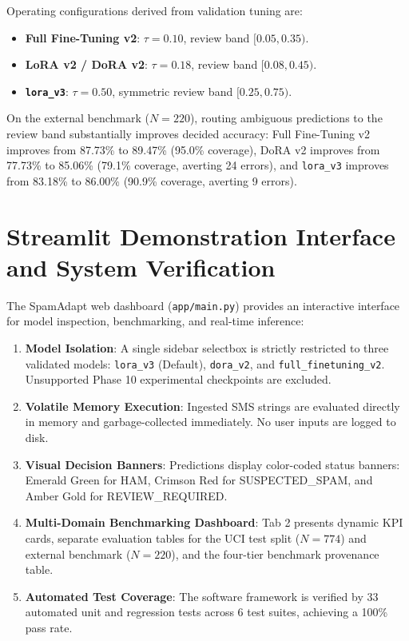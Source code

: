 \documentclass[conference]{IEEEtran}
\begin{document}
Operating configurations derived from validation tuning are:
\begin{itemize}
    \item \textbf{Full Fine-Tuning v2}: $\tau = 0.10$, review band $[0.05, 0.35)$.
    \item \textbf{LoRA v2 / DoRA v2}: $\tau = 0.18$, review band $[0.08, 0.45)$.
    \item \textbf{\texttt{lora\_v3}}: $\tau = 0.50$, symmetric review band $[0.25, 0.75)$.
\end{itemize}

On the external benchmark ($N=220$), routing ambiguous predictions to the review band substantially improves decided accuracy: Full Fine-Tuning v2 improves from 87.73\% to 89.47\% (95.0\% coverage), DoRA v2 improves from 77.73\% to 85.06\% (79.1\% coverage, averting 24 errors), and \texttt{lora\_v3} improves from 83.18\% to 86.00\% (90.9\% coverage, averting 9 errors).

\section{Streamlit Demonstration Interface and System Verification}
\label{sec:demo_interface}

The SpamAdapt web dashboard (\texttt{app/main.py}) provides an interactive interface for model inspection, benchmarking, and real-time inference:
\begin{enumerate}
    \item \textbf{Model Isolation}: A single sidebar selectbox is strictly restricted to three validated models: \texttt{lora\_v3} (Default), \texttt{dora\_v2}, and \texttt{full\_finetuning\_v2}. Unsupported Phase 10 experimental checkpoints are excluded.
    \item \textbf{Volatile Memory Execution}: Ingested SMS strings are evaluated directly in memory and garbage-collected immediately. No user inputs are logged to disk.
    \item \textbf{Visual Decision Banners}: Predictions display color-coded status banners: Emerald Green for HAM, Crimson Red for SUSPECTED\_SPAM, and Amber Gold for REVIEW\_REQUIRED.
    \item \textbf{Multi-Domain Benchmarking Dashboard}: Tab 2 presents dynamic KPI cards, separate evaluation tables for the UCI test split ($N=774$) and external benchmark ($N=220$), and the four-tier benchmark provenance table.
    \item \textbf{Automated Test Coverage}: The software framework is verified by 33 automated unit and regression tests across 6 test suites, achieving a 100\% pass rate.
\end{enumerate}
\end{document}
